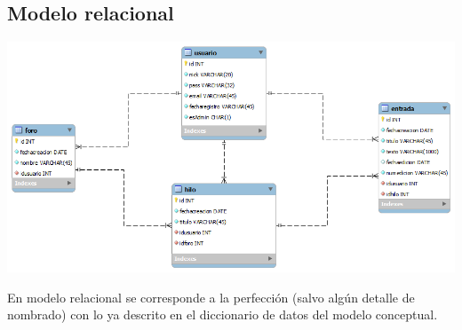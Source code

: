 \documentclass[12pt, a4paper, titlepage]{article}
\begin{document}
\subsection{Modelo relacional}

\includegraphics[width=15cm]{./img/relacional.png}

En modelo relacional se corresponde a la perfección (salvo algún detalle de nombrado) con lo ya descrito en el diccionario de datos del modelo conceptual.
\end{document}
